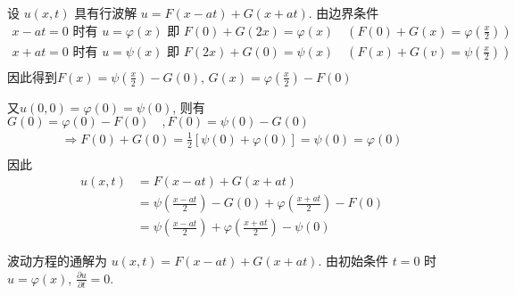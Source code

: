 \begin{questions}

\begin{solution}
设 $ u(x, t) $ 具有行波解 $ u=F(x-a t)+G(x+a t) $.
由边界条件
$$
\begin{array}{l}
	x -at =0 \text { 时有 } u=\varphi(x) \text { 即 } F(0)+G(2 x)=\varphi(x) \quad \left( F(0)+G(x)=\varphi\left(\frac{x}{2}\right)\right) \\
	x+a t=0 \text { 时有 } u=\psi(x) \text { 即 } F(2 x)+G(0)=\psi(x)  \quad \left(F(x)+G(v)=\psi\left(\frac{x}{2}\right)\right) \\
\end{array}
$$
因此得到$ F(x)=\psi\left(\frac{x}{2}\right)-G(0) $, $ G(x)=\varphi\left(\frac{x}{2}\right)-F(0) $

又$u(0,0)=\varphi(0)=\psi(0)$, 
则有$  G(0)=\varphi(0)-F(0) \quad,F(0)=\psi(0)-G(0)$
$$
\begin{array}{l}
	\Rightarrow F(0)+G(0)=\frac{1}{2}[\psi(0)+\varphi(0)]=\psi(0)=\varphi(0) \\
\end{array}
$$
因此
$$
\begin{aligned}
	u(x, t) & =F(x-a t)+G(x+a t)   \\
	& =\psi\left(\frac{x-a t}{2}\right)-G(0)+\varphi\left(\frac{x+a t}{2}\right)-F(0) \\
	& =\psi\left(\frac{x-a t}{2}\right)+\varphi\left(\frac{x+a t}{2}\right)-\psi(0)
\end{aligned}
$$
\end{solution}


\begin{solution}
波动方程的通解为 $ u(x, t)=F(x-a t)+G(x+a t) $.
由初始条件 $ t=0 $ 时 $ u=\varphi (x) $, $ \frac{\partial u}{\partial t}=0 $.


\end{solution}
\end{questions}
